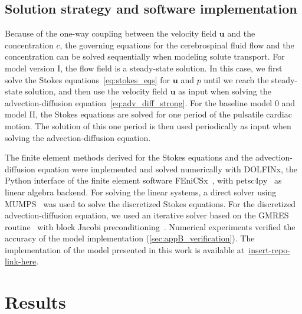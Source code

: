 \documentclass[fleqn]{wlscirep}
\newcommand{\uu}{\mathbf{u}}
\begin{document}
\subsection*{Solution strategy and software implementation}
Because of the one-way coupling between the velocity field $\uu$ and the concentration $c$, the governing equations for the cerebrospinal fluid flow and the concentration can be solved sequentially when modeling solute transport. For model version I, the flow field is a steady-state solution. In this case, we first solve the Stokes equations~\eqref{eq:stokes_eqs} for $\uu$ and $p$ until we reach the steady-state solution, and then use the velocity field $\uu$ as input when solving the advection-diffusion equation~\eqref{eq:adv_diff_strong}. For the baseline model 0 and model II, the Stokes equations are solved for one period of the pulsatile cardiac motion. The solution of this one period is then used periodically as input when solving the advection-diffusion equation.

The finite element methods derived for the Stokes equations and the advection-diffusion equation were implemented and solved numerically with DOLFINx, the Python interface of the finite element software FEniCSx~\cite{TheFEniCSProject2024FEniCSxDocumentation}, with petsc4py~\cite{Dalcin2011ParallelPython} as linear algebra backend. For solving the linear systems, a direct solver using MUMPS~\cite{Amestoy2011Mumps} was used to solve the discretized Stokes equations. For the discretized advection-diffusion equation, we used an iterative solver based on the GMRES routine~\cite{Saad1986GMRES:Systems} with block Jacobi preconditioning~\cite{Jacobi1845UeberGleichungen}. Numerical experiments verified the accuracy of the model implementation (\cref{sec:appB_verification}). The implementation of the model presented in this work is available at~\url{insert-repo-link-here}. 


\section*{Results}\label{sec:results}
\end{document}
